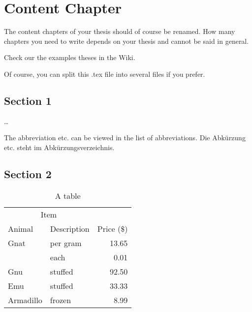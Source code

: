 
\chapter{Content Chapter}
\label{ch:Content1}

The content chapters of your thesis should of course be renamed. How many chapters you need to write depends on your thesis and cannot be said in general. 

Check our the examples theses in the Wiki. 

Of course, you can split this .tex file into several files if you prefer. 


\section{Section 1}
\label{ch:Content1:sec:Section1}

\dots

{The abbreviation etc.  can be viewed in the list of abbreviations.}
{Die Abkürzung etc. steht im Abkürzungsverzeichnis.}



\section{Section 2}
\label{ch:Content1:sec:Section2}

\begin{table}[htb]
\centering
\begin{tabular}{llr}
\toprule
\multicolumn{2}{c}{Item} \\
\cmidrule(r){1-2}
Animal    & Description & Price (\$) \\
\midrule
Gnat      & per gram    & 13.65      \\
          & each        & 0.01       \\
Gnu       & stuffed     & 92.50      \\
Emu       & stuffed     & 33.33      \\
Armadillo & frozen      & 8.99       \\
\bottomrule
\end{tabular}
\caption{A table}
\end{table}



